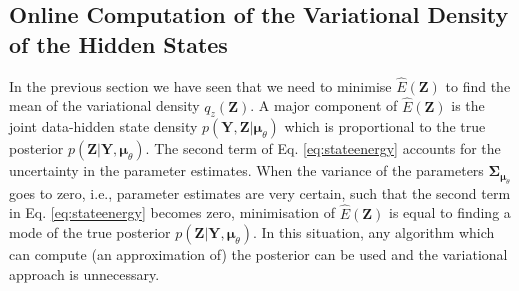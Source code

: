 \documentclass[a4paper,10pt]{article}
\newcommand{\bs}[1]{\mathbf{#1}}					%
\newcommand{\bgs}[1]{\boldsymbol{#1}}				%
\renewcommand{\ss}{z}         %
\newcommand{\spm}{\mu}    %
\renewcommand{\sp}{\theta}    %
\newcommand{\ppm}{\bgs{\spm}}   %
\newcommand{\Ps}{\bs{Z}}    %
\newcommand{\Po}{\bs{Y}}    %
\newcommand{\Cov}{\bgs{\Sigma}}			%
\begin{document}
\subsection{Online Computation of the Variational Density of the Hidden States}
In the previous section we have seen that we need to minimise $\hat{E}(\Ps)$ to find the mean of the variational density $q_\ss(\Ps)$. A major component of $\hat{E}(\Ps)$ is the joint data-hidden state density $p(\Po,\Ps|\ppm_\sp)$ which is proportional to the true posterior $p(\Ps|\Po,\ppm_\sp)$. The second term of Eq. \ref{eq:stateenergy} accounts for the uncertainty in the parameter estimates. When the variance of the parameters $\Cov_{\ppm_\sp}$ goes to zero, i.e., parameter estimates are very certain, such that the second term in Eq. \ref{eq:stateenergy} becomes zero, minimisation of $\hat{E}(\Ps)$ is equal to finding a mode of the true posterior $p(\Ps|\Po,\ppm_\sp)$. In this situation, any algorithm which can compute (an approximation of) the posterior can be used and the variational approach is unnecessary. 
\end{document}
